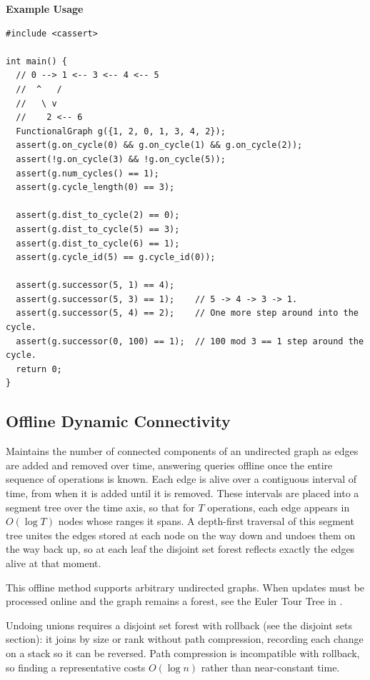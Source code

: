\textbf{Example Usage}\par
\begin{lstlisting}[style=cpp]
#include <cassert>

int main() {
  // 0 --> 1 <-- 3 <-- 4 <-- 5
  //  ^   /
  //   \ v
  //    2 <-- 6
  FunctionalGraph g({1, 2, 0, 1, 3, 4, 2});
  assert(g.on_cycle(0) && g.on_cycle(1) && g.on_cycle(2));
  assert(!g.on_cycle(3) && !g.on_cycle(5));
  assert(g.num_cycles() == 1);
  assert(g.cycle_length(0) == 3);

  assert(g.dist_to_cycle(2) == 0);
  assert(g.dist_to_cycle(5) == 3);
  assert(g.dist_to_cycle(6) == 1);
  assert(g.cycle_id(5) == g.cycle_id(0));

  assert(g.successor(5, 1) == 4);
  assert(g.successor(5, 3) == 1);    // 5 -> 4 -> 3 -> 1.
  assert(g.successor(5, 4) == 2);    // One more step around into the cycle.
  assert(g.successor(0, 100) == 1);  // 100 mod 3 == 1 step around the cycle.
  return 0;
}
\end{lstlisting}
\subsection{Offline Dynamic Connectivity}
\label{sec:4.2.10}
Maintains the number of connected components of an undirected graph as edges are added and removed over time, answering queries offline once the entire sequence of operations is known. Each edge is alive over a contiguous interval of time, from when it is added until it is removed. These intervals are placed into a segment tree over the time axis, so that for $T$ operations, each edge appears in $O(\log T)$ nodes whose ranges it spans. A depth-first traversal of this segment tree unites the edges stored at each node on the way down and undoes them on the way back up, so at each leaf the disjoint set forest reflects exactly the edges alive at that moment.

This offline method supports arbitrary undirected graphs. When updates must be processed online and the graph remains a forest, see the Euler Tour Tree in .

Undoing unions requires a disjoint set forest with rollback (see the disjoint sets section): it joins by size or rank without path compression, recording each change on a stack so it can be reversed. Path compression is incompatible with rollback, so finding a representative costs $O(\log n)$ rather than near-constant time.


